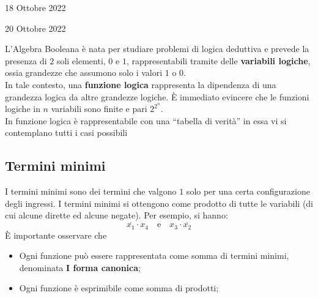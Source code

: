 \documentclass[a4paper]{extarticle}
\begin{document}
\newpage
\begin{center}
    18 Ottobre 2022
\end{center}

\newpage
\begin{center}
    20 Ottobre 2022
\end{center}
L'Algebra Booleana è nata per studiare problemi di logica deduttiva e prevede la presenza di $2$ soli elementi, $0$ e $1$, rappresentabili tramite delle \textbf{variabili logiche}, ossia grandezze che assumono solo i valori $1$ o $0$.\\
In tale contesto, una \textbf{funzione logica} rappresenta la dipendenza di una grandezza logica da altre grandezze logiche. È immediato evincere che le funzioni logiche in $n$ variabili sono finite e pari $2^{2^n}$.\\
In funzione logica è rappresentabile con una “tabella di verità” in essa vi si contemplano tutti i casi possibili

\begin{figure}[H]
\end{figure}

\vspace{1em}
\noindent
\subsection{Termini minimi}
I termini minimi sono dei termini che valgono $1$ solo per una certa configurazione degli ingressi. I termini minimi si ottengono come prodotto di tutte le variabili (di cui alcune dirette ed alcune negate). Per esempio, si hanno:
\[\overline{x_1} \cdot x_4 \hspace{1em} \text{e} \hspace{1em} x_3 \cdot \overline{x_2}\]
È importante osservare che
\begin{itemize}
    \item Ogni funzione può essere rappresentata come somma di termini minimi, denominata \textbf{I forma canonica};
    \item Ogni funzione è esprimibile come somma di prodotti;
\end{itemize}
\end{document}
